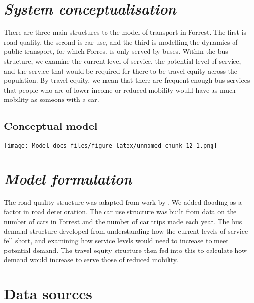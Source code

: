 \documentclass[
  11pt,
]{book}
\begin{document}
\hypertarget{system-conceptualisation-7}{%
\section{\texorpdfstring{\emph{System conceptualisation}}{System conceptualisation}}\label{system-conceptualisation-7}}

There are three main structures to the model of transport in Forrest. The first is road quality, the second is car use, and the third is modelling the dynamics of public transport, for which Forrest is only served by buses. Within the bus structure, we examine the current level of service, the potential level of service, and the service that would be required for there to be travel equity across the population. By travel equity, we mean that there are frequent enough bus services that people who are of lower income or reduced mobility would have as much mobility as someone with a car.

\hypertarget{conceptual-model-9}{%
\subsection{Conceptual model}\label{conceptual-model-9}}

\texttt{[image: Model-docs\_files/figure-latex/unnamed-chunk-12-1.png]}

\hypertarget{model-formulation-7}{%
\section{\texorpdfstring{\emph{Model formulation}}{Model formulation}}\label{model-formulation-7}}

The road quality structure was adapted from work by \citet{fallah-fini_measuring_2015}. We added flooding as a factor in road deterioration. The car use structure was built from data on the number of cars in Forrest and the number of car trips made each year. The bus demand structure developed from understanding how the current levels of service fell short, and examining how service levels would need to increase to meet potential demand. The travel equity structure then fed into this to calculate how demand would increase to serve those of reduced mobility.

\hypertarget{data-sources-8}{%
\section{Data sources}\label{data-sources-8}}
\end{document}
